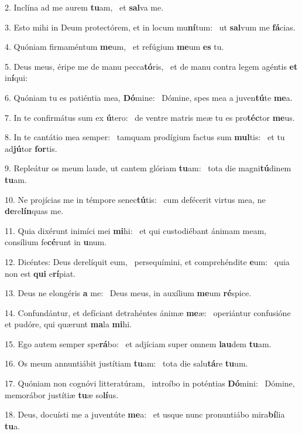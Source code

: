 2. Inclína ad me aurem \textbf{tu}am, \ast\  et \textbf{sal}va me.\

3. Esto mihi in Deum protectórem, et in locum mu\textbf{ní}tum: \ast\  ut \textbf{sal}vum me \textbf{fá}cias.\

4. Quóniam firmaméntum \textbf{me}um, \ast\  et refúgium \textbf{me}um \textbf{es} tu.\

5. Deus meus, éripe me de manu pecca\textbf{tó}ris, \ast\  et de manu contra legem agéntis \textbf{et} in\textbf{í}qui:\

6. Quóniam tu es patiéntia mea, \textbf{Dó}mine: \ast\  Dómine, spes mea a juven\textbf{tú}te \textbf{me}a.\

7. In te confirmátus sum ex \textbf{ú}tero: \ast\  de ventre matris meæ tu es pro\textbf{téc}tor \textbf{me}us.\

8. In te cantátio mea semper: \dag\  tamquam prodígium factus sum \textbf{mul}tis: \ast\  et tu ad\textbf{jú}tor \textbf{for}tis.\

9. Repleátur os meum laude, ut cantem glóriam \textbf{tu}am: \ast\  tota die magni\textbf{tú}dinem \textbf{tu}am.\

10. Ne projícias me in témpore senec\textbf{tú}tis: \ast\  cum defécerit virtus mea, ne \textbf{de}re\textbf{lín}quas me.\

11. Quia dixérunt inimíci mei \textbf{mi}hi: \ast\  et qui custodiébant ánimam meam, consílium fe\textbf{cé}runt in \textbf{u}num.\

12. Dicéntes: Deus derelíquit eum, \dag\  persequímini, et comprehéndite \textbf{e}um: \ast\  quia non est \textbf{qui} e\textbf{rí}piat.\

13. Deus ne elongéris \textbf{a} me: \ast\  Deus meus, in auxílium \textbf{me}um \textbf{ré}spice.\

14. Confundántur, et defíciant detrahéntes ánimæ \textbf{me}æ: \ast\  operiántur confusióne et pudóre, qui quærunt \textbf{ma}la \textbf{mi}hi.\

15. Ego autem semper spe\textbf{rá}bo: \ast\  et adjíciam super omnem \textbf{lau}dem \textbf{tu}am.\

16. Os meum annuntiábit justítiam \textbf{tu}am: \ast\  tota die salu\textbf{tá}re \textbf{tu}um.\

17. Quóniam non cognóvi litteratúram, \dag\  introíbo in poténtias \textbf{Dó}mini: \ast\  Dómine, memorábor justítiæ \textbf{tu}æ so\textbf{lí}us.\

18. Deus, docuísti me a juventúte \textbf{me}a: \ast\  et usque nunc pronuntiábo mira\textbf{bí}lia \textbf{tu}a.\

